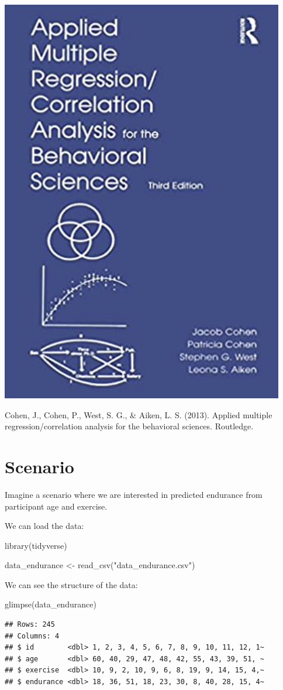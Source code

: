 \documentclass[
]{krantz}
\makeatletter
\newenvironment{Shaded}{\begin{snugshade}}{\end{snugshade}}
\newcommand{\FunctionTok}[1]{\textcolor[rgb]{0,0,0}{#1}}
\newcommand{\NormalTok}[1]{#1}
\newcommand{\OtherTok}[1]{\textcolor[rgb]{0.37,0.37,0.37}{#1}}
\newcommand{\StringTok}[1]{\textcolor[rgb]{0.5,0.5,0.5}{#1}}
\newenvironment{kframe}{%
\medskip{}
\setlength{\fboxsep}{.8em}
 \def\at@end@of@kframe{}%
 \ifinner\ifhmode%
  \def\at@end@of@kframe{\end{minipage}}%
  \begin{minipage}{\columnwidth}%
 \fi\fi%
 \def\FrameCommand##1{\hskip\@totalleftmargin \hskip-\fboxsep
 \colorbox{shadecolor}{##1}\hskip-\fboxsep
     \hskip-\linewidth \hskip-\@totalleftmargin \hskip\columnwidth}%
 \MakeFramed {\advance\hsize-\width
   \@totalleftmargin\z@ \linewidth\hsize
   \@setminipage}}%
 {\par\unskip\endMakeFramed%
 \at@end@of@kframe}
\renewenvironment{Shaded}{\begin{kframe}}{\end{kframe}}
\makeatother
\begin{document}
\includegraphics[width=0.3\linewidth]{ch_mmr/images/ccwa_cover}

Cohen, J., Cohen, P., West, S. G., \& Aiken, L. S. (2013). Applied multiple regression/correlation analysis for the behavioral sciences. Routledge.

\hypertarget{scenario}{%
\section{Scenario}\label{scenario}}

Imagine a scenario where we are interested in predicted endurance from participant age and exercise.

We can load the data:

\begin{Shaded}
\begin{Highlighting}[]
\FunctionTok{library}\NormalTok{(tidyverse)}

\NormalTok{data\_endurance }\OtherTok{\textless{}{-}} \FunctionTok{read\_csv}\NormalTok{(}\StringTok{"data\_endurance.csv"}\NormalTok{)}
\end{Highlighting}
\end{Shaded}

We can see the structure of the data:

\begin{Shaded}
\begin{Highlighting}[]
\FunctionTok{glimpse}\NormalTok{(data\_endurance)}
\end{Highlighting}
\end{Shaded}

\begin{verbatim}
## Rows: 245
## Columns: 4
## $ id        <dbl> 1, 2, 3, 4, 5, 6, 7, 8, 9, 10, 11, 12, 1~
## $ age       <dbl> 60, 40, 29, 47, 48, 42, 55, 43, 39, 51, ~
## $ exercise  <dbl> 10, 9, 2, 10, 9, 6, 8, 19, 9, 14, 15, 4,~
## $ endurance <dbl> 18, 36, 51, 18, 23, 30, 8, 40, 28, 15, 4~
\end{verbatim}
\end{document}
